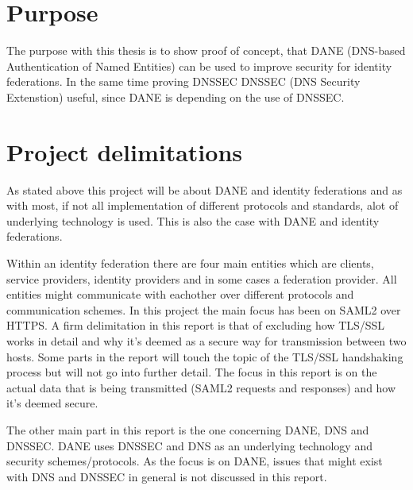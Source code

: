 \section{Purpose}
The purpose with this thesis is to show proof of concept, that DANE (DNS-based Authentication of Named Entities) can be used to improve security for identity federations.
In the same time proving DNSSEC DNSSEC \cite{rfc:4033,rfc:4034,rfc:4035,rfc:5011} (DNS Security Extenstion) useful, since DANE is 
depending on the use of DNSSEC.

\section{Project delimitations}
As stated above this project will be about DANE and identity federations and as with most, if not all implementation of different protocols and standards, alot of underlying technology is used.
This is also the case with DANE and identity federations.

Within an identity federation there are four main entities which are clients, service providers, identity providers and in some cases a federation provider.
All entities might communicate with eachother over different protocols and communication schemes.
In this project the main focus has been on SAML2 over HTTPS.
A firm delimitation in this report is that of excluding how TLS/SSL works in detail and why it's deemed as a secure way for transmission between two hosts.
Some parts in the report will touch the topic of the TLS/SSL handshaking process but will not go into further detail.
The focus in this report is on the actual data that is being transmitted (SAML2 requests and responses) and how it's deemed secure. 

The other main part in this report is the one concerning DANE, DNS and DNSSEC.
DANE uses DNSSEC and DNS as an underlying technology and security schemes/protocols.
As the focus is on DANE, issues that might exist with DNS and DNSSEC in general is not discussed in this report.






